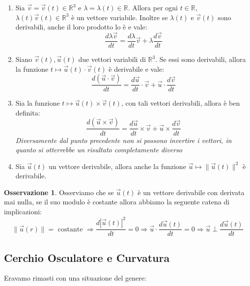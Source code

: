 \documentclass[11pt,a4paper,twoside]{article}
\theoremstyle{definition}
\newtheorem*{oss}{Osservazione}
\begin{document}
\begin{enumerate}
	\item Sia $\vec v = \vec v(t) \in \mathbb R^3$ e $\lambda = \lambda(t) \in \mathbb R$. Allora per ogni $t \in \mathbb R$, $\lambda(t)\vec v (t) \in \mathbb R^3$ è un vettore variabile. Inoltre se $\lambda(t)$ e $\vec v(t)$ sono derivabili, anche il loro prodotto lo è e vale:
		\[ \frac{d\lambda \vec v}{dt} = \frac{d\lambda}{dt}\vec v + \lambda \frac{d \vec v}{dt} \]
	\item Siano $\vec v(t), \vec u(t)$ due vettori variabili di $\mathbb R^3$. Se essi sono derivabili, allora la funzione $t \mapsto \vec u(t)\cdot \vec v(t)$ è derivabile e vale:
		\[ \frac{d(\vec u \cdot \vec v)}{dt} = \frac{d \vec u}{dt} \cdot \vec v + \vec u \cdot \frac{d \vec v}{dt} \]
	\item Sia la funzione $t \mapsto \vec u(t) \times \vec v(t)$, con tali vettori derivabili, allora è ben definita:
		\[ \frac{d(\vec u \times \vec v)}{dt} = \frac{d \vec u}{dt} \times \vec v + \vec u \times \frac{d \vec v}{dt} \]
		\textit{Diversamente dal punto precedente non si possono invertire i vettori, in quanto si otterrebbe un risultato completamente diverso}
	\item Sia $\vec u(t)$ un vettore derivabile, allora anche la funzione $\vec u \mapsto \|\vec u(t)\|^2$ è derivabile.
\end{enumerate}

\begin{oss}
	Osserviamo che se $\vec u(t)$ è un vettore derivabile con derivata mai nulla, se il suo modulo è costante allora abbiamo la seguente catena di implicazioni:
	\[
		\|\vec u(r)\| = \text{ costante }\Rightarrow \frac{d|\vec u(t)|^2}{dt} = 0 \Rightarrow \vec u \cdot \frac{d \vec u(t)}{dt}=0 \Rightarrow \vec u \perp \frac{d \vec u(t)}{dt}
	\]
\end{oss}

\subsection{Cerchio Osculatore e Curvatura}

Eravamo rimasti con una situazione del genere:

\begin{center}
\end{center}
\end{document}
